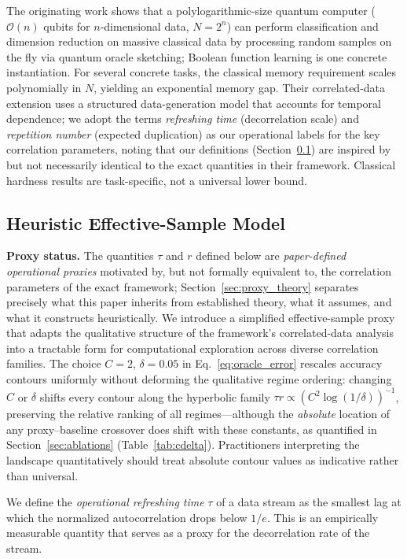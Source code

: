 \documentclass[sensors,article,submit,pdftex,moreauthors]{Definitions/mdpi}
\newenvironment{definition}[1][]{\begin{Definition}[#1]}{\end{Definition}}
\newcommand{\bigO}{\mathcal{O}}
\begin{document}
The originating work \citep{zhao2026exponential} shows that a polylogarithmic-size quantum computer ($\bigO(n)$ qubits for $n$-dimensional data, $N = 2^n$) can perform classification and dimension reduction on massive classical data by processing random samples on the fly via quantum oracle sketching; Boolean function learning is one concrete instantiation. For several concrete tasks, the classical memory requirement scales polynomially in $N$, yielding an exponential memory gap. Their correlated-data extension uses a structured data-generation model that accounts for temporal dependence; we adopt the terms \emph{refreshing time} (decorrelation scale) and \emph{repetition number} (expected duplication) as our operational labels for the key correlation parameters, noting that our definitions (Section~\ref{sec:heuristic_model}) are inspired by but not necessarily identical to the exact quantities in their framework. Classical hardness results are task-specific, not a universal lower bound.

\subsection{Heuristic Effective-Sample Model}
\label{sec:heuristic_model}

\textbf{Proxy status.} The quantities $\tau$ and $r$ defined below are \emph{paper-defined operational proxies} motivated by, but not formally equivalent to, the correlation parameters of the exact framework; Section~\ref{sec:proxy_theory} separates precisely what this paper inherits from established theory, what it assumes, and what it constructs heuristically. We introduce a simplified effective-sample proxy that adapts the qualitative structure of the framework's correlated-data analysis into a tractable form for computational exploration across diverse correlation families. The choice $C{=}2$, $\delta{=}0.05$ in Eq.~\eqref{eq:oracle_error} rescales accuracy contours uniformly without deforming the qualitative regime ordering: changing $C$ or $\delta$ shifts every contour along the hyperbolic family $\tau r \propto (C^2 \log(1/\delta))^{-1}$, preserving the relative ranking of all regimes---although the \emph{absolute} location of any proxy--baseline crossover does shift with these constants, as quantified in Section~\ref{sec:ablations} (Table~\ref{tab:cdelta}). Practitioners interpreting the landscape quantitatively should treat absolute contour values as indicative rather than universal.

\begin{definition}[Refreshing Time -- operational proxy]
We define the \emph{operational refreshing time} $\tau$ of a data stream as the smallest lag at which the normalized autocorrelation drops below $1/e$. This is an empirically measurable quantity that serves as a proxy for the decorrelation rate of the stream.
\end{definition}
\end{document}

